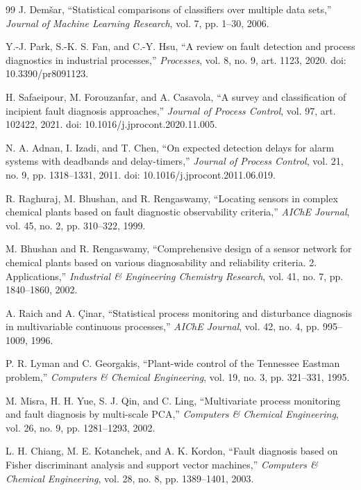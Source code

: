 \documentclass[10pt,twocolumn,a4paper]{article}
\begin{document}
\begin{thebibliography}{99}
J. Dem\v{s}ar, ``Statistical comparisons of classifiers over multiple data
sets,'' \emph{Journal of Machine Learning Research}, vol. 7, pp. 1--30, 2006.

Y.-J. Park, S.-K. S. Fan, and C.-Y. Hsu, ``A review on fault detection and
process diagnostics in industrial processes,'' \emph{Processes}, vol. 8, no. 9,
art. 1123, 2020. doi: 10.3390/pr8091123.

H. Safaeipour, M. Forouzanfar, and A. Casavola, ``A survey and classification of
incipient fault diagnosis approaches,'' \emph{Journal of Process Control},
vol. 97, art. 102422, 2021. doi: 10.1016/j.jprocont.2020.11.005.

N. A. Adnan, I. Izadi, and T. Chen, ``On expected detection delays for alarm
systems with deadbands and delay-timers,'' \emph{Journal of Process Control},
vol. 21, no. 9, pp. 1318--1331, 2011. doi: 10.1016/j.jprocont.2011.06.019.

R. Raghuraj, M. Bhushan, and R. Rengaswamy, ``Locating sensors in complex
chemical plants based on fault diagnostic observability criteria,'' \emph{AIChE
Journal}, vol. 45, no. 2, pp. 310--322, 1999.

M. Bhushan and R. Rengaswamy, ``Comprehensive design of a sensor network for
chemical plants based on various diagnosability and reliability criteria. 2.
Applications,'' \emph{Industrial \& Engineering Chemistry Research}, vol. 41,
no. 7, pp. 1840--1860, 2002.

A. Raich and A. \c{C}inar, ``Statistical process monitoring and disturbance
diagnosis in multivariable continuous processes,'' \emph{AIChE Journal},
vol. 42, no. 4, pp. 995--1009, 1996.

P. R. Lyman and C. Georgakis, ``Plant-wide control of the Tennessee Eastman
problem,'' \emph{Computers \& Chemical Engineering}, vol. 19, no. 3,
pp. 321--331, 1995.

M. Misra, H. H. Yue, S. J. Qin, and C. Ling, ``Multivariate process monitoring
and fault diagnosis by multi-scale PCA,'' \emph{Computers \& Chemical
Engineering}, vol. 26, no. 9, pp. 1281--1293, 2002.

L. H. Chiang, M. E. Kotanchek, and A. K. Kordon, ``Fault diagnosis based on
Fisher discriminant analysis and support vector machines,'' \emph{Computers \&
Chemical Engineering}, vol. 28, no. 8, pp. 1389--1401, 2003.


\end{thebibliography}
\end{document}
